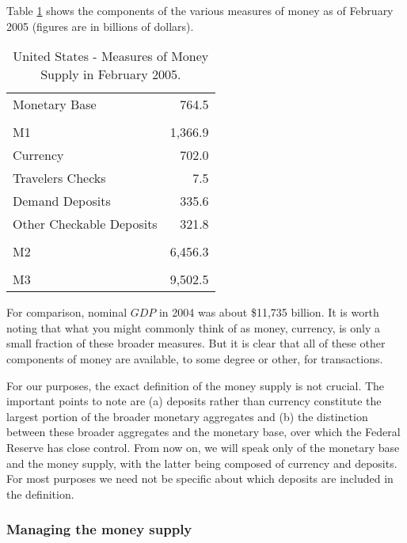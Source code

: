 \documentclass[letterpaper,12pt]{article}
\begin{document}
Table \ref{fig:money_measures} shows the components of the various
measures of money as of February 2005 (figures are in billions of
dollars).
%
\begin{table}
\begin{center}
\begin{tabular}{lr}
\hline%
Monetary Base                            & 764.5 \\
\\
M1 & 1,366.9 \\
\hspace{0.25in} Currency                 & 702.0 \\
\hspace{0.25in} Travelers Checks         & 7.5 \\
\hspace{0.25in} Demand Deposits          & 335.6 \\
\hspace{0.25in} Other Checkable Deposits & 321.8 \\
\\
M2 & 6,456.3 \\
\\
M3 & 9,502.5 \\
\hline
%
\end{tabular}
\end{center}
\caption{United States - Measures of Money Supply in February
2005.}\label{fig:money_measures}
\end{table}
%
For comparison, nominal $GDP$ in 2004 was about \$11,735 billion. It
is worth noting that what you might commonly think of as money,
currency, is only a small fraction of these broader measures. But it
is clear that all of these other components of money are available,
to some degree or other, for transactions.

For our purposes, the exact definition of the money supply is not
crucial. The important points to note are (a) deposits rather than
currency constitute the largest portion of the broader monetary
aggregates and (b) the distinction between these broader aggregates
and the monetary base, over which the Federal Reserve has close
control. From now on, we will speak only of the monetary base and
the money supply, with the latter being composed of currency and
deposits. For most purposes we need not be specific about which
deposits are included in the definition.

\subsubsection*{Managing the money supply}
\end{document}
